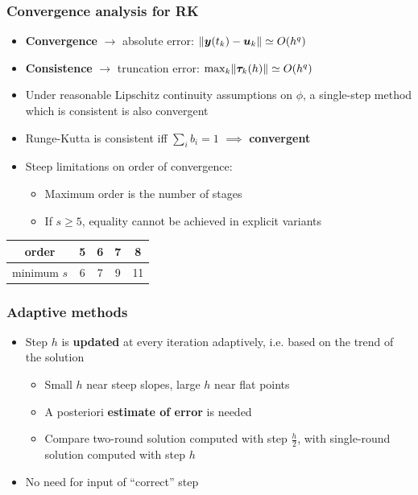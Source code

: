 \documentclass{beamer}
\begin{document}
\begin{frame} %
\frametitle{Convergence analysis for RK}
	\begin{itemize}
		\item \textbf{Convergence} $\to$ absolute error: $\lVert\boldsymbol y (t_k) - \boldsymbol u_k\rVert \simeq O(h^q)$
		\item \textbf{Consistence} $\to$ truncation error: $\max_k \lVert\boldsymbol \tau_k(h)\rVert \simeq O(h^q)$
		\item Under reasonable Lipschitz continuity assumptions on $\phi$, a single-step method which is consistent is also convergent
		\pause
		\item Runge-Kutta is consistent iff $\sum_i b_i = 1$ $\implies$ \textbf{convergent}
		\item Steep limitations on order of convergence:
		\begin{itemize}
			\item Maximum order is the number of stages
			\item If $s \ge 5$, equality cannot be achieved in explicit variants \\[15pt]
		\end{itemize}
	\end{itemize}
	\begin{center}
		\begin{tabular}{c|cccc}
			order & 5 & 6 & 7 & 8\\
			\hline
			minimum $s$ & 6 & 7 & 9 & 11 
		\end{tabular}
	\end{center}
\end{frame}


\begin{frame} %
	\frametitle{Adaptive methods}
	\begin{itemize}
		\item Step $h$ is \textbf{updated} at every iteration adaptively, i.e. based on the trend of the solution
		\begin{itemize}
			\item Small $h$ near steep slopes, large $h$ near flat points
			\item A posteriori \textbf{estimate of error} is needed
			\item Compare two-round solution computed with step $\frac{h}{2}$, with single-round solution computed with step $h$
		\end{itemize}
		\item No need for input of ``correct'' step
	\end{itemize}
\end{frame}
\end{document}
